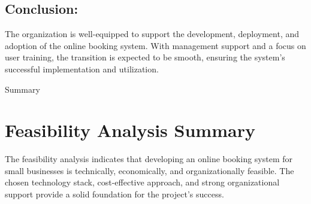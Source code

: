 \subsection*{Conclusion:}
The organization is well-equipped to support the development, deployment, and adoption of the online booking system. With management support and a focus on user training, the transition is expected to be smooth, ensuring the system's successful implementation and utilization.

Summary

\section{Feasibility Analysis Summary}
\label{sec:feasibility-analysis-summary}
The feasibility analysis indicates that developing an online booking system for small businesses is technically, economically, and organizationally feasible. The chosen technology stack, cost-effective approach, and strong organizational support provide a solid foundation for the project's success.
